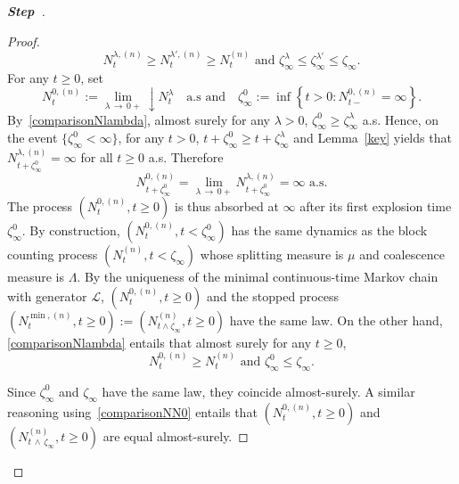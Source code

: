 \documentclass[AHL,Unicode,longabstracts,published]{cedram}
\newcommand{\clL}{\mathcal{L}}
\newcounter{stepcount}
\newenvironment{step}{\refstepcounter{stepcount}\begin{proof}[\textbf{Step~\thestepcount}]}{\end{proof}}
\begin{document}
\begin{step}
\begin{proof}
\begin{equation}\label{comparisonNlambda}
N^{\lambda,(n)}_t\geq N_t^{\lambda',(n)}\geq N_t^{(n)}
\text{ and } \zeta_{\infty}^{\lambda}\leq \zeta_{\infty}^{\lambda'}\leq \zeta_{\infty}.
\end{equation}
For any $t\geq 0$, set 
\[
N_t^{0,(n)}:=\underset{\lambda\,\rightarrow\,0+}{\lim}\downarrow N_t^{\lambda}\quad\text{a.s and}\quad\zeta^0_{\infty}:=\inf\left\{t>0: N_{t-}^{0,(n)}=\infty\right\}.
\]
By~\eqref{comparisonNlambda}, almost surely for any $\lambda>0$, $\zeta^{0}_{\infty}\geq \zeta_{\infty}^{\lambda}$ a.s. Hence, on the event $\{\zeta_{\infty}^{0}<\infty\}$, for any $t>0$, $t+\zeta_{\infty}^{0}\geq t+\zeta_{\infty}^{\lambda}$ and Lemma~\ref{key} yields that $N^{\lambda,(n)}_{t+\zeta_{\infty}^{0}}=\infty$ for all $t\geq 0$ a.s. Therefore
\[
N^{0,(n)}_{t+\zeta_{\infty}^{0}}=\underset{\lambda \,\rightarrow\,0+}{\lim} N^{\lambda,(n)}_{t+\zeta_{\infty}^{0}}=\infty \text{ a.s.}
\]
The process $(N_t^{0,(n)},t\geq 0)$ is thus absorbed at $\infty$ after its first explosion time $\zeta_\infty^0$. By construction, $(N_t^{0,(n)},t<\zeta^{0}_{\infty})$ has the same dynamics as the block counting process $(N_t^{(n)},t<\zeta_{\infty})$ whose splitting measure is $\mu$ and coalescence measure is $\Lambda$. By the uniqueness of the minimal continuous-time Markov chain with generator $\clL$, $(N_t^{0,(n)},t\geq 0)$ and the stopped process $(N_t^{\min,(n)},t\geq 0):=(N_{t\wedge \zeta_{\infty}}^{(n)},t\geq 0)$ have the same law. On the other hand, \eqref{comparisonNlambda} entails that almost surely for any $t\geq 0$,
\begin{equation}\label{comparisonNN0}
N_t^{0,(n)}\geq N_t^{(n)} \text{ and } \zeta_{\infty}^0\leq \zeta_{\infty}.
\end{equation}
\pagebreak

\noindent Since $\zeta_{\infty}^0$ and $\zeta_{\infty}$ have the same law, they coincide almost-surely. A similar reasoning using~\eqref{comparisonNN0} entails that $(N_t^{0,(n)},t\geq 0)$ and $(N^{(n)}_{t\,\wedge\,\zeta_\infty},t\geq 0)$ are equal almost-surely.
\end{proof}\let\qed\relax
\end{step}
\vspace*{4pt}
\end{document}
